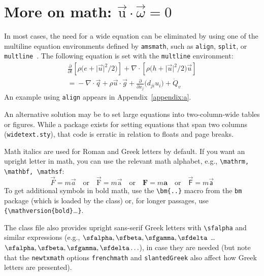 \documentclass[grid,balance,upint,subscriptcorrection,varvw,mathalfa=cal=euler,spanish,french,greek,russian,vietnamese,colorlinks]{asmeconf}
\begin{document}
\section[More on math: u\cdot\omega=0]{More on math: $\vec{\mathrm{u}}\cdot\vec{\omega}=0$}\label{sec:moremath}

In most cases, the need for a wide equation can be eliminated by using one of the multiline equation environments defined by 
\texttt{amsmath}, such as \texttt{align}, \texttt{split}, or \texttt{multline}~\cite{amsmath}. The following equation is set with the 
\texttt{multline} environment:
\begin{multline}\label{eqn:energy}
\frac{\partial}{\partial t}\left[\rho\bigl(e + \lvert\vec{u}\rvert^2\big/2\bigr)\right]  + \nabla\cdot\left[\rho\bigl(h + \lvert\vec{u}\rvert^2\big/2 \bigr)\vec{u}\right] \\
 ={}-\nabla \cdot \vec{q} +  \rho \vec{u}\cdot\vec{g}+ \frac{\partial}{\partial x_j}\bigl(d_{ji}u_i\bigr) + \dot{Q}_v
\end{multline}
An example using \texttt{align} appears in Appendix~\ref{appendix:a}.

An alternative solution may be to set large equations into two-column-wide tables or figures. While a package exists for setting equations that span two columns (\texttt{widetext.sty}), that code is erratic in relation to floats and page breaks.

Math italics are used for Roman and Greek letters by default.  If you want an upright letter in math, you can use the relevant math alphabet, e.g., \verb|\mathrm, \mathbf, \mathsf|:
\begin{equation}\label{eqn:dw}
\vec{F} = m \vec{a} \quad\textrm{or}\quad \vec{\mathrm{F}} = m \vec{\mathrm{a}} \quad\textrm{or}\quad \mathbf{F} = m \mathbf{a} \quad\textrm{or}\quad \vec{\mathsf{F}} = m \vec{\mathsf{a}}
\end{equation}
To get additional symbols in bold math, use the \verb|\bm{..}| macro from the \texttt{bm} package (which is loaded by the class) or, for longer passages, use \verb|{\mathversion{bold}|\ldots\texttt{\}}.

The class file also provides upright sans-serif Greek letters with \verb|\sfalpha| and similar expressions (e.g., $\sfalpha, \sfbeta, \sfgamma, \sfdelta$ \ldots $\bm{\sfalpha, \sfbeta, \sfgamma, \sfdelta \ldots}$), in case they are needed (but note that the \verb|newtxmath| options \verb|frenchmath| and \verb|slantedGreek| also affect how Greek letters are presented).
\end{document}
